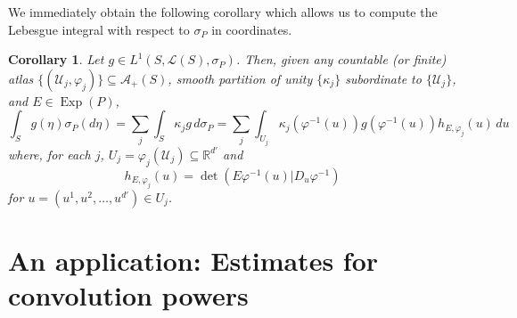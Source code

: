 \documentclass[11pt]{article}
\newtheorem{corollary}[theorem]{Corollary}
\theoremstyle{remark}
\newcommand\Exp{\operatorname{Exp}}
\renewcommand\det{\operatorname{det}}
\begin{document}
\noindent We immediately obtain the following corollary which allows us to compute the Lebesgue integral with respect to $\sigma_P$ in coordinates.
\begin{corollary}\label{cor:IntegralFormula}
Let $g\in L^1(S,\mathcal{L}(S),\sigma_P)$. Then, given any  countable (or finite) atlas $\{(\mathcal{U}_j,\varphi_j)\}\subseteq\mathcal{A}_+(S)$,  smooth partition of unity $\{\kappa_j\}$ subordinate to $\{\mathcal{U}_j\}$, and $E\in\Exp(P)$,
\begin{equation*}
\int_S g(\eta)\sigma_P(d\eta)=\sum_{j}\int_S \kappa_jg\,d\sigma_P=\sum_j\int_{U_j}\kappa_j(\varphi^{-1}(u))g(\varphi^{-1}(u))h_{E,\varphi_j}(u)\,du
\end{equation*}
where, for each $j$, $U_j=\varphi_j(\mathcal{U}_j)\subseteq\mathbb{R}^{d'}$ and
\begin{equation*}
    h_{E,\varphi_j}(u)=\det(E\varphi^{-1}(u)\vert D_u\varphi^{-1})
\end{equation*}
for $u=(u^1,u^2,\dots,u^{d'})\in U_j$. 
\end{corollary}





\section{An application: Estimates for convolution powers}\label{sec:ConvolutionPowers}
\end{document}
